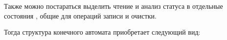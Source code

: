 % 

\par{Также можно постараться выделить чтение и анализ статуса в отдельные состояния , общие для операций записи и очистки.}
\par{Тогда структура конечного автомата приобретает следующий вид:}

% 


